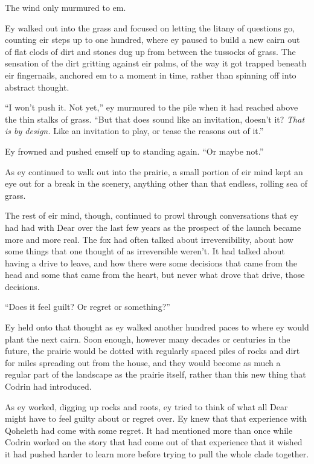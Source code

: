 The wind only murmured to em.

Ey walked out into the grass and focused on letting the litany of questions go, counting eir steps up to one hundred, where ey paused to build a new cairn out of flat clods of dirt and stones dug up from between the tussocks of grass. The sensation of the dirt gritting against eir palms, of the way it got trapped beneath eir fingernails, anchored em to a moment in time, rather than spinning off into abstract thought.

``I won't push it. Not yet,'' ey murmured to the pile when it had reached above the thin stalks of grass. ``But that does sound like an invitation, doesn't it? \emph{That is by design.} Like an invitation to play, or tease the reasons out of it.''

Ey frowned and pushed emself up to standing again. ``Or maybe not.''

As ey continued to walk out into the prairie, a small portion of eir mind kept an eye out for a break in the scenery, anything other than that endless, rolling sea of grass.

The rest of eir mind, though, continued to prowl through conversations that ey had had with Dear over the last few years as the prospect of the launch became more and more real. The fox had often talked about irreversibility, about how some things that one thought of as irreversible weren't. It had talked about having a drive to leave, and how there were some decisions that came from the head and some that came from the heart, but never what drove that drive, those decisions.

``Does it feel guilt? Or regret or something?''

Ey held onto that thought as ey walked another hundred paces to where ey would plant the next cairn. Soon enough, however many decades or centuries in the future, the prairie would be dotted with regularly spaced piles of rocks and dirt for miles spreading out from the house, and they would become as much a regular part of the landscape as the prairie itself, rather than this new thing that Codrin had introduced.

As ey worked, digging up rocks and roots, ey tried to think of what all Dear might have to feel guilty about or regret over. Ey knew that that experience with Qoheleth had come with some regret. It had mentioned more than once while Codrin worked on the story that had come out of that experience that it wished it had pushed harder to learn more before trying to pull the whole clade together.

